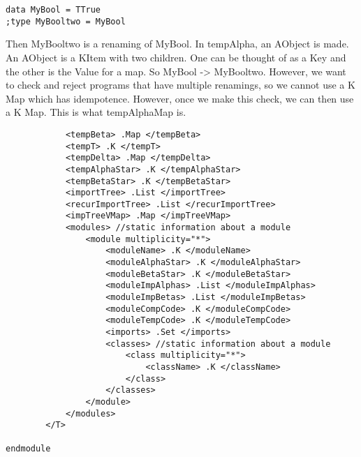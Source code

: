\begin{lstlisting}
data MyBool = TTrue
;type MyBooltwo = MyBool
\end{lstlisting}

Then MyBooltwo is a renaming of MyBool. In tempAlpha, an AObject is made. An AObject is a KItem with two children. One can be thought of as a Key and the other is the Value for a map. So MyBool -> MyBooltwo. However, we want to check and reject programs that have multiple renamings, so we cannot use a K Map which has idempotence. However, once we make this check, we can then use a K Map. This is what tempAlphaMap is.

\begin{lstlisting}
            <tempBeta> .Map </tempBeta>
            <tempT> .K </tempT>
            <tempDelta> .Map </tempDelta>
            <tempAlphaStar> .K </tempAlphaStar>
            <tempBetaStar> .K </tempBetaStar>
            <importTree> .List </importTree>
            <recurImportTree> .List </recurImportTree>
            <impTreeVMap> .Map </impTreeVMap>
            <modules> //static information about a module
                <module multiplicity="*">
                    <moduleName> .K </moduleName>
                    <moduleAlphaStar> .K </moduleAlphaStar>
                    <moduleBetaStar> .K </moduleBetaStar>
                    <moduleImpAlphas> .List </moduleImpAlphas>
                    <moduleImpBetas> .List </moduleImpBetas>
                    <moduleCompCode> .K </moduleCompCode>
                    <moduleTempCode> .K </moduleTempCode>
                    <imports> .Set </imports>
                    <classes> //static information about a module
                        <class multiplicity="*">
                            <className> .K </className>
                        </class>
                    </classes>
                </module>
            </modules>
        </T>

endmodule
\end{lstlisting}